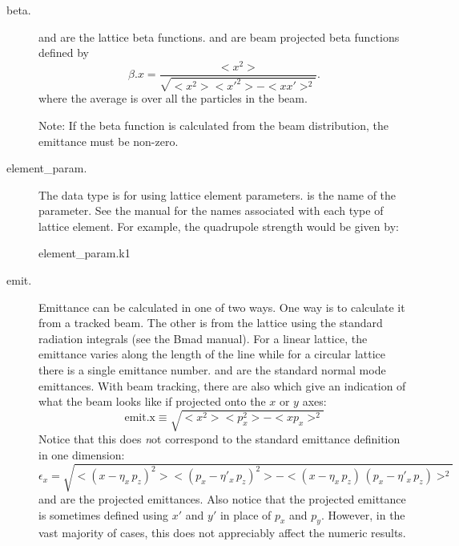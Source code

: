   \begin{description}

  \item[beta.] \Newline
{} and  are the lattice beta functions.  and
 are beam projected beta functions defined by
\begin{equation}
  \beta.x = \frac{<x^{2}>}{\sqrt{<x^{2}> <x'^{2}> - <x x'>^{2}}}.
\end{equation}
where the average \vn{<>} is over all the particles in the beam.

Note: If the beta function is calculated from the beam distribution,
the emittance must be non-zero.

  \item[element\_param.] \Newline
The  data type is for using lattice
element parameters.  is the name of the
parameter. See the \bmad manual for the names associated with each
type of lattice element.  For example, the  quadrupole strength
would be given by:
\begin{example}
  element_param.k1
\end{example}

  \item[emit.] \Newline
Emittance can be calculated in one of two ways. One way is to
calculate it from a tracked beam. The other is from the lattice using
the standard radiation integrals (see the Bmad manual). For a linear
lattice, the emittance varies along the length of the line while for a
circular lattice there is a single emittance number. 
and  are the standard normal mode emittances. With
beam tracking, there are also  which give an
indication of what the beam looks like if projected onto the $x$ or
$y$ axes:
\begin{equation}
  \mbox{emit.x} \equiv \sqrt{<x^2> <p_x^2> - <x p_x>^2}
\end{equation}
Notice that this does {\emph not} correspond to the standard emittance
definition in one dimension:
\begin{equation}
  \epsilon_x = \sqrt{<(x - \eta_x \, p_z)^2> <(p_x - \eta'_x \, p_z)^2> - 
  <(x - \eta_x \, p_z) \, (p_x - \eta'_x \, p_z)>^2}
\end{equation}
 and  are the projected emittances.
Also notice that the projected emittance is sometimes defined using
$x'$ and $y'$ in place of $p_x$ and $p_y$. However, in the vast
majority of cases, this does not appreciably affect the numeric
results.


\end{description}

